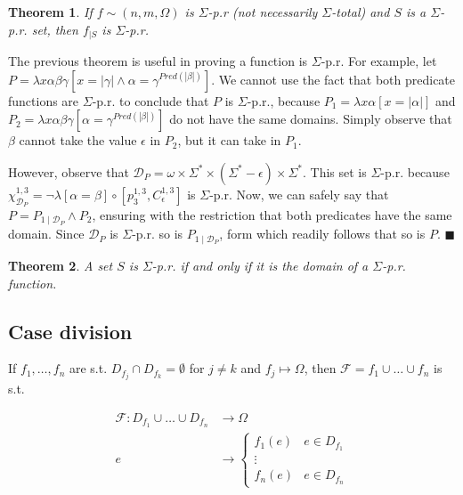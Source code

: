 \documentclass[a4paper, 12pt]{article}
\newtheorem{theorem}{Theorem}
\newtheorem{theorem}{Theorem}
\begin{document}
\begin{theorem}
    If $f \sim (n, m, \Omega)$ is $\Sigma$-p.r (not necessarily $\Sigma$-total) and $S$ is a $\Sigma$-p.r. set,
    then $f_{\mid S}$ is $\Sigma$-p.r. 
\end{theorem}

The previous theorem is useful in proving a function is $\Sigma$-p.r. For
example, let $P = \lambda x\alpha\beta \gamma \left[  x = |\gamma| \land \alpha
= \gamma^{Pred(|\beta|)}\right] $. We cannot use the fact that both predicate
functions are $\Sigma$-p.r. to conclude that $P$ is $\Sigma$-p.r., because $P_1
= \lambda x\alpha [x = |\alpha|]$ and $P_2 = \lambda x \alpha \beta \gamma
[\alpha =
\gamma^{Pred(|\beta|)}]$ do not have the same domains. Simply observe that
$\beta$ cannot take the value $\epsilon$ in $P_2$, but it can take in $P_1$.


However, observe that $\mathcal{D}_P = \omega \times \Sigma^{*} \times
(\Sigma^{*} - \epsilon) \times \Sigma^{*} $. This set is $\Sigma$-p.r. because
$\chi_{\mathcal{D}_P}^{1, 3} = \neg \lambda \left[ \alpha = \beta \right] \circ
\left[ p_{3}^{1, 3}, C_{\epsilon}^{1, 3} \right]$ is $\Sigma$-p.r. Now, we can
safely say that $P = P_{1\mid \mathcal{D}_P} \land P_2$, ensuring with the
restriction that both predicates have the same domain. Since $\mathcal{D}_P$ is
$\Sigma$-p.r. so is $P_{1\mid \mathcal{D}_P}$, form which readily follows that
so is $P$. $\blacksquare$

\begin{theorem}
    A set $S$ is $\Sigma$-p.r. if and only if it is the domain of a
    $\Sigma$-p.r. function.
\end{theorem}

\subsection{Case division}

If $f_1, \ldots, f_n$ are s.t. $D_{f_j} \cap D_{f_k} = \emptyset$ for $j \neq k$
and $f_j \mapsto \Omega$, then $\mathcal{F} = f_1 \cup \ldots \cup f_n$ is s.t. 

\begin{align*}
    \mathcal{F} : D_{f_1} \cup \ldots \cup D_{f_n} &\to \Omega \\
    e &\to \begin{cases}
        f_1(e) & e \in D_{f_1} \\ 
               \vdots \\ 
        f_n(e) & e \in D_{f_n}
    \end{cases}
\end{align*}
\end{document}
